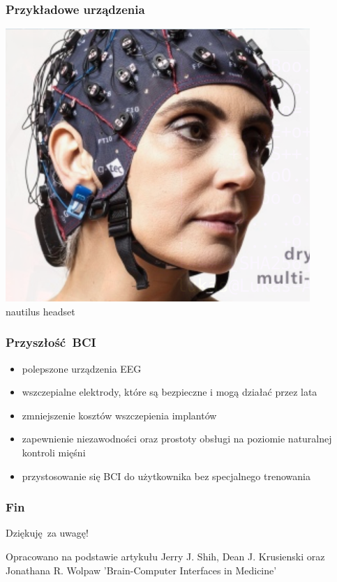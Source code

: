 \documentclass{beamer}
\begin{document}
\begin{frame}
    \frametitle{Przykładowe urządzenia}
    \begin{center}
        \includegraphics[scale=0.5]{nautillus.png}
        \\

        {\tiny nautilus headset }
    \end{center}    
\end{frame}

\begin{frame}
    \frametitle{Przyszłość BCI}
    \begin{itemize}
        \item polepszone urządzenia EEG
        \item wszczepialne elektrody, które są bezpieczne i mogą działać przez lata
        \item zmniejszenie kosztów wszczepienia implantów
        \item zapewnienie niezawodności oraz prostoty obsługi na poziomie naturalnej kontroli mięśni
        \item przystosowanie się BCI do użytkownika bez specjalnego trenowania 
    \end{itemize}
\end{frame}

\begin{frame}
    \frametitle{Fin}
    \begin{center}
    Dziękuję za uwagę!
    \end{center}
    \mbox{}
    \vfill
    \begin{center}
        {\tiny Opracowano na podstawie artykułu Jerry J. Shih, Dean J. Krusienski oraz Jonathana R. Wolpaw 'Brain-Computer Interfaces in Medicine'}
    \end{center}
\end{frame}
\end{document}
